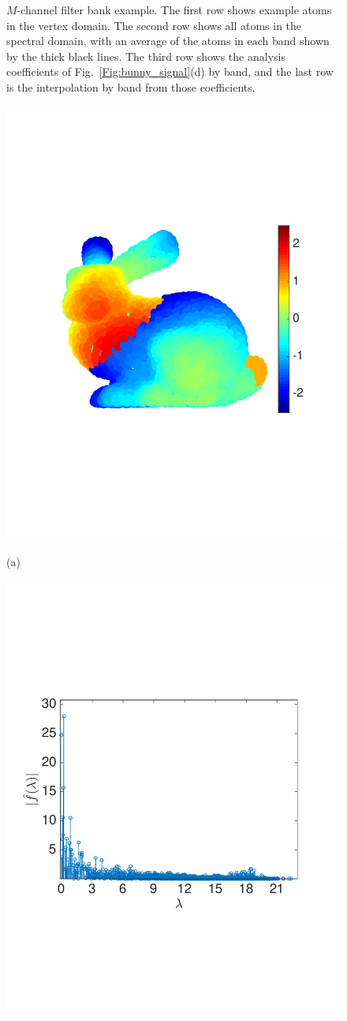 \documentclass[journal, 10pt]{IEEEtran}
\begin{document}
\begin{figure}[bth]
\begin{minipage}[m]{0.16\linewidth}
\end{minipage}
\caption{$M$-channel filter bank example. The first row shows example atoms in the vertex domain. The second row shows all atoms in the spectral domain, with an average of the atoms in each band shown by the thick black lines. The third row shows the analysis coefficients of Fig.\ \ref{Fig:bunny_signal}(d) by band, and the last row is the interpolation by band from those coefficients.}\label{Fig:bunny_coef}
\end{figure}

\begin{figure}[tbh]
\begin{minipage}[m]{0.48\linewidth}
\centerline{\includegraphics[width=.7\linewidth]{fig_bunny_signal}}
\centerline{\small{(a)}}
\end{minipage}
\begin{minipage}[m]{0.48\linewidth}
\centerline{\includegraphics[width=.72\linewidth]{fig_bunny_signal_hat}~~~~~~~}

\end{minipage}
\end{figure}
\end{document}
